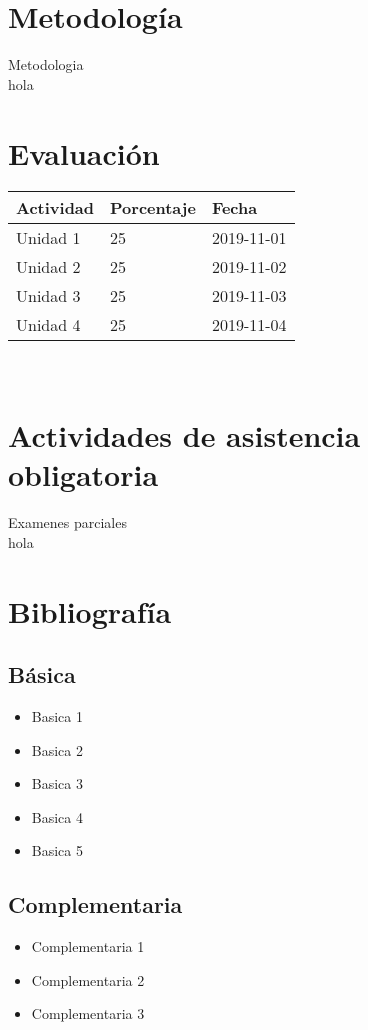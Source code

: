 \documentclass[11pt]{article}
\begin{document}
\section*{Metodología}

Metodologia
\\hola

\section*{Evaluación}
\noindent \begin{tabular}{R{0.5\textwidth} C{0.2\textwidth} C{0.2\textwidth}}
	\toprule
	\textbf{Actividad} & \textbf{Porcentaje} & \textbf{Fecha} \\
	\midrule
	Unidad 1 & 25 & 2019-11-01 \\ Unidad 2 & 25 & 2019-11-02 \\ Unidad 3 & 25 & 2019-11-03 \\ Unidad 4 & 25 & 2019-11-04 \\ 
	\midrule
\end{tabular}
\\
\section*{Actividades de asistencia obligatoria}

Examenes parciales
\\hola

\section*{Bibliografía}

\subsection*{Básica}

\begin{itemize}
\item Basica 1 \item Basica 2 \item Basica 3 \item Basica 4 \item Basica 5 
\end{itemize}

\subsection*{Complementaria}

\begin{itemize}
\item Complementaria 1 \item Complementaria 2 \item Complementaria 3 
\end{itemize}
\end{document}
